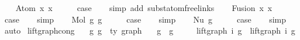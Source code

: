 \begin{isabellebody}
\ \ \isamarkupfalse%
\ {\isacharparenleft}{\kern0pt}Atom\ x{}\ x{}{\isacharparenright}{\kern0pt}\isanewline
\ \ \isamarkupfalse%
\ \isamarkupfalse%
\ {\isacharquery}{\kern0pt}case\isanewline
\ \ \isamarkupfalse%
\ {\isacharparenleft}{\kern0pt}simp\ add{\isacharcolon}{\kern0pt}\ subst{\isacharunderscore}{\kern0pt}atom{\isacharunderscore}{\kern0pt}freelinks{\isacharparenright}{\kern0pt}\isanewline
{}\isamarkupfalse%
\isanewline
\ \ \isamarkupfalse%
\ {\isacharparenleft}{\kern0pt}Fusion\ x{}\ x{}{\isacharparenright}{\kern0pt}\isanewline
\ \ \isamarkupfalse%
\ \isamarkupfalse%
\ {\isacharquery}{\kern0pt}case\isanewline
\ \ \isamarkupfalse%
\ simp\isanewline
{}\isamarkupfalse%
\isanewline
\ \ \isamarkupfalse%
\ {\isacharparenleft}{\kern0pt}Mol\ g{}\ g{}{\isacharparenright}{\kern0pt}\isanewline
\ \ \isamarkupfalse%
\ \isamarkupfalse%
\ {\isacharquery}{\kern0pt}case\isanewline
\ \ \isamarkupfalse%
\ simp\isanewline
{}\isamarkupfalse%
\isanewline
\ \ \isamarkupfalse%
\ {\isacharparenleft}{\kern0pt}Nu\ g{\isacharparenright}{\kern0pt}\isanewline
\ \ \isamarkupfalse%
\ \isamarkupfalse%
\ {\isacharquery}{\kern0pt}case\isanewline
\ \ \isamarkupfalse%
\ simp\isanewline
{}\isamarkupfalse%
\ auto%
\endisatagproof
{\isafoldproof}%
%
\isadelimproof
\isanewline
%
\endisadelimproof
\isanewline
\isanewline
{}\isamarkupfalse%
\ lift{\isacharunderscore}{\kern0pt}graph{\isacharunderscore}{\kern0pt}cong{\isacharcolon}{\kern0pt}\isanewline
\ \ \ g{}\ g{}\ {\isacharcolon}{\kern0pt}{\isacharcolon}{\kern0pt}\ {\isachardoublequoteopen}{\isacharprime}{\kern0pt}ty\ graph{\isachardoublequoteclose}\isanewline
\ \ \ {\isachardoublequoteopen}g{}\ {\isasymsimeq}\ g{}{\isachardoublequoteclose}\isanewline
\ \ \ \ \ {\isachardoublequoteopen}lift{\isacharunderscore}{\kern0pt}graph\ i\ g{}\ {\isasymsimeq}\ lift{\isacharunderscore}{\kern0pt}graph\ i\ g{}{\isachardoublequoteclose}\isanewline
%
\isadelimproof
\ \ %
\endisadelimproof
%
\isatagproof
{}\isamarkupfalse%

\end{isabellebody}
